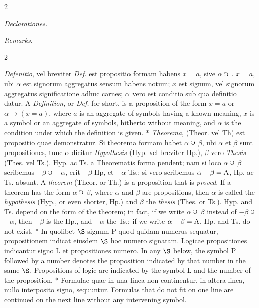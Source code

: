 \documentclass{book}
\newcommand{\C}{\mathop{\sbox0{$\displaystyle$$\reflectbox{C}$} %
\raisebox{-\height+\ht0-0.05cm}[\ht0][\dp0]{\scalebox{0.8}[0.8]{\copy0}}}\displaylimits} %
\newcommand{\abs}{\mathop{\rotatebox[origin=c]{180}{V}}}
\newcommand\peanoHeadingSmall[1]{ \vspace{0.75cm} \textit{#1} \nopagebreak[4]

\vspace{0.25cm} \nopagebreak[1]}
\newenvironment{translateTwoCol}
               { %
                 \columnratio{0.5, 0.5} \begin{paracol}{2}
                 \newcommand{\LAT}{\switchcolumn[0]*}
                 \newcommand{\ENG}{\switchcolumn[1]}
               }
               { %
                 \let\ENG\undefined
                 \let\LAT\undefined
                 \end{paracol}
               }
\begin{document}
\begin{translateTwoCol}
\centering
{}
{}
\peanoHeadingSmall{Declarationes.}
\ENG
\peanoHeadingSmall{Remarks.}
\end{translateTwoCol}

\begin{translateTwoCol}
\emph{Defenitio}, vel breviter \emph{Def.} est propositio formam habens $x = a$, sive $\alpha$ $\C$ . $x = a$, ubi $\alpha$ est signorum aggregatus sensum habens notum; $x$ est signum, vel signorum aggregatus significatione adhuc carnes; $\alpha$ vero est conditio sub qua definitio datur.
\ENG
A \emph{Definition}, or \emph{Def.} for short, is a proposition of the form $x=a$ or $\alpha \rightarrow (x = a)$, where $a$ is an aggregate of symbols having a known meaning, $x$ is a symbol or an aggregate of symbols, hitherto without meaning, and $\alpha$ is the condition under which the definition is given.
\LAT
\emph{Theorema}, (Theor. vel Th) est propositio quae demonstratur. Si theorema formam habet $\alpha$ $\C$ $\beta$, ubi $\alpha$ et $\beta$ sunt propositiones, tunc $\alpha$ dicitur \emph{Hypothesis} (Hyp. vel breviter Hp.), $\beta$ vero \emph{Thesis} (Thes. vel Ts.). Hyp. ac Ts. a Theorematis forma pendent; nam si loco $\alpha$ $\C$ $\beta$ scribemus $- \beta$ $\C$ $- \alpha$, erit $- \beta$ Hp, et $- \alpha$ Ts.; si vero scribemus $\alpha - \beta = \abs$, Hp. ac Ts. absunt.
\ENG
A \emph{theorem} (Theor. or Th.) is a proposition that is \emph{proved}. If a theorem has the form $\alpha$ $\C$ $\beta$, where $\alpha$ and $\beta$ are propositions, then $\alpha$ is called the \emph{hypothesis} (Hyp., or even shorter, Hp.) and $\beta$ the \emph{thesis} (Thes. or Ts.). Hyp. and Ts. depend on the form of the theorem; in fact, if we write $\alpha$ $\C$ $\beta$ instead of $- \beta$ $\C$ $- \alpha$, then $- \beta$ is the Hp., and $- \alpha$ the Ts.; if we write $\alpha - \beta = \abs$, Hp. and Ts. do not exist.
\LAT
In quolibet $\S$ signum P quod quidam numerus sequatur, propositionem indicat eiusdem $\S$ hoc numero signatam. Logicae propositiones indicantur signo L et propositiones numero.
\ENG
In any $\S$ below, the symbol P followed by a number denotes the proposition indicated by that number in the same $\S$. Propositions of logic are indicated by the symbol L and the number of the proposition.
\LAT
Formulae quae in una linea non continentur, in altera linea, nullo interposito signo, sequuntur.
\ENG
Formulas that do not fit on one line are continued on the next line without any intervening symbol.
\end{translateTwoCol}
\end{document}
